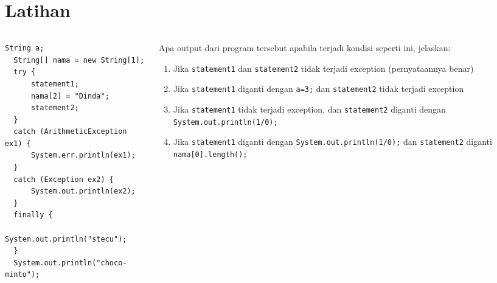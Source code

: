 \documentclass{../praktikum-ppt}
\begin{document}
    \section{Latihan}
    \begin{frame}[fragile]
      \begin{columns}
        \begin{column}{0.45\textwidth}
          \begin{lstlisting}[numberstyle=\scriptsize\ttfamily\color{lightgray},basicstyle=\scriptsize\ttfamily]
  String a;
  String[] nama = new String[1];
  try {
      statement1;
      nama[2] = "Dinda";
      statement2;
  }
  catch (ArithmeticException ex1) {
      System.err.println(ex1);
  }
  catch (Exception ex2) {
      System.out.println(ex2);
  }
  finally {
      System.out.println("stecu");
  }
  System.out.println("choco-minto");
            \end{lstlisting}
        \end{column}
        \begin{column}{0.5\textwidth}
        \begin{latihan}
          Apa output dari program tersebut apabila terjadi kondisi seperti ini, jelaskan:
        
        \begin{enumerate}
            \item Jika \texttt{statement1} dan \texttt{statement2} tidak terjadi exception (pernyataannya benar)
            \item Jika \texttt{statement1} diganti dengan \texttt{a=3;} dan \texttt{statement2} tidak terjadi exception
            \item Jika \texttt{statement1} tidak terjadi exception, dan \texttt{statement2} diganti dengan \texttt{System.out.println(1/0);}
            \item Jika \texttt{statement1} diganti dengan \texttt{System.out.println(1/0);} dan \texttt{statement2} diganti \texttt{nama[0].length();}
        \end{enumerate}
          \end{latihan}
        \end{column}
      \end{columns}

    \end{frame}
    
\end{document}
